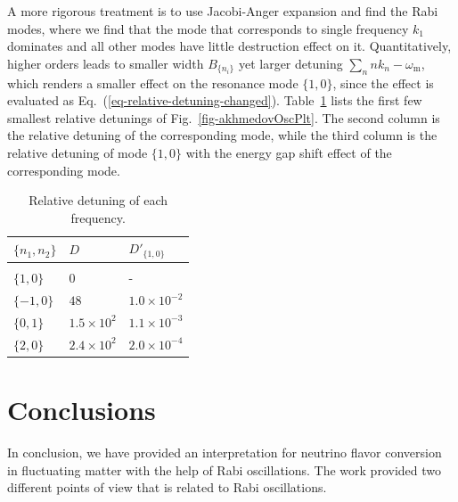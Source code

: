 \documentclass[%
reprint,
 amsmath,amssymb,
 prd,
]{revtex4-1}
\newcommand{\RD}{D}
\begin{document}
A more rigorous treatment is to use Jacobi-Anger expansion and find the Rabi modes, where we find that the mode that corresponds to single frequency $k_1$ dominates and all other modes have little destruction effect on it. Quantitatively, higher orders leads to smaller width $B_{\{n_i\}}$ yet larger detuning $\sum_{n} nk_n-\omega_{\mathrm m}$, which renders a smaller effect on the resonance mode $\{1,0\}$, since the effect is evaluated as Eq.~(\ref{eq-relative-detuning-changed}).
Table~\ref{tab-q-values-each-mode} lists the first few smallest relative detunings of Fig.~\ref{fig-akhmedovOscPlt}. The second column is the relative detuning of the corresponding mode, while the third column is the relative detuning of mode $\{1,0\}$ with the energy gap shift effect of the corresponding mode.




\begin{table}
\caption{\label{tab-q-values-each-mode}Relative detuning of each frequency.}
\begin{ruledtabular}
\begin{tabular}{lll}
 $\{n_1,n_2\}$ &  $\RD$ & $\RD'_{\{1,0\}}$   \\
\hline \\
 $\{1,0\}$ & $0$ &  - \\
 $\{-1,0\}$ & $48$ &  $1.0\times 10^{-2}$ \\
 $\{0,1\}$ & $1.5\times 10^2$ &  $1.1\times 10^{-3}$  \\
 $\{2,0\}$ & $2.4\times 10^{2}$ & $2.0\times 10^{-4}$
\end{tabular}
\end{ruledtabular}
\end{table}





\section{\label{conclusions}Conclusions}



In conclusion, we have provided an interpretation for neutrino flavor conversion in fluctuating matter with the help of Rabi oscillations. The work provided two different points of view that is related to Rabi oscillations.
\end{document}
